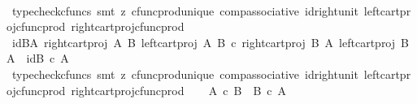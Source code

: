 \begin{isabellebody}
\ \ \ \ \isamarkupfalse%
\ {\isacharparenleft}{\kern0pt}typecheck{\isacharunderscore}{\kern0pt}cfuncs{\isacharcomma}{\kern0pt}\ smt\ {\isacharparenleft}{\kern0pt}z{}{\isacharparenright}{\kern0pt}\ cfunc{\isacharunderscore}{\kern0pt}prod{\isacharunderscore}{\kern0pt}unique\ comp{\isacharunderscore}{\kern0pt}associative{}\ id{\isacharunderscore}{\kern0pt}right{\isacharunderscore}{\kern0pt}unit{}\ left{\isacharunderscore}{\kern0pt}cart{\isacharunderscore}{\kern0pt}proj{\isacharunderscore}{\kern0pt}cfunc{\isacharunderscore}{\kern0pt}prod\ right{\isacharunderscore}{\kern0pt}cart{\isacharunderscore}{\kern0pt}proj{\isacharunderscore}{\kern0pt}cfunc{\isacharunderscore}{\kern0pt}prod{\isacharparenright}{\kern0pt}\isanewline
\ \ \isamarkupfalse%
\ id{\isacharunderscore}{\kern0pt}BA{\isacharcolon}{\kern0pt}\ {\isachardoublequoteopen}{\isasymlangle}right{\isacharunderscore}{\kern0pt}cart{\isacharunderscore}{\kern0pt}proj\ A\ B{\isacharcomma}{\kern0pt}\ left{\isacharunderscore}{\kern0pt}cart{\isacharunderscore}{\kern0pt}proj\ A\ B{\isasymrangle}\ {\isasymcirc}\isactrlsub c\ {\isasymlangle}right{\isacharunderscore}{\kern0pt}cart{\isacharunderscore}{\kern0pt}proj\ B\ A{\isacharcomma}{\kern0pt}\ left{\isacharunderscore}{\kern0pt}cart{\isacharunderscore}{\kern0pt}proj\ B\ A{\isasymrangle}\ {\isacharequal}{\kern0pt}\ id{\isacharparenleft}{\kern0pt}B\ {\isasymtimes}\isactrlsub c\ A{\isacharparenright}{\kern0pt}{\isachardoublequoteclose}\isanewline
\ \ \ \ \isamarkupfalse%
\ {\isacharparenleft}{\kern0pt}typecheck{\isacharunderscore}{\kern0pt}cfuncs{\isacharcomma}{\kern0pt}\ smt\ {\isacharparenleft}{\kern0pt}z{}{\isacharparenright}{\kern0pt}\ cfunc{\isacharunderscore}{\kern0pt}prod{\isacharunderscore}{\kern0pt}unique\ comp{\isacharunderscore}{\kern0pt}associative{}\ id{\isacharunderscore}{\kern0pt}right{\isacharunderscore}{\kern0pt}unit{}\ left{\isacharunderscore}{\kern0pt}cart{\isacharunderscore}{\kern0pt}proj{\isacharunderscore}{\kern0pt}cfunc{\isacharunderscore}{\kern0pt}prod\ right{\isacharunderscore}{\kern0pt}cart{\isacharunderscore}{\kern0pt}proj{\isacharunderscore}{\kern0pt}cfunc{\isacharunderscore}{\kern0pt}prod{\isacharparenright}{\kern0pt}\isanewline
\ \ \isamarkupfalse%
\ {\isachardoublequoteopen}A\ {\isasymtimes}\isactrlsub c\ B\ {\isasymcong}\ B\ {\isasymtimes}\isactrlsub c\ A{\isachardoublequoteclose}\isanewline
\ \ \ \ \isamarkupfalse%

\end{isabellebody}
